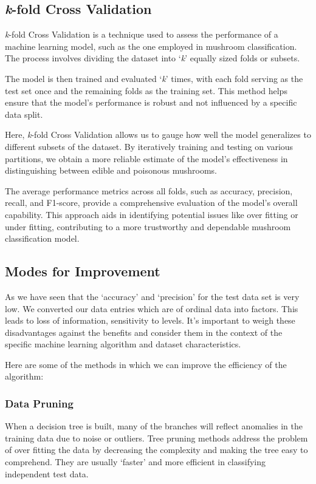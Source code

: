 \documentclass{article}
\begin{document}
\begin{justify}
\subsection{\textit{k}-fold Cross Validation}
\textit{k}-fold Cross Validation is a technique used to assess the performance of a machine learning model, such as the one employed in mushroom classification. The process involves dividing the dataset into `\textit{k}' equally sized folds or subsets. 

The model is then trained and evaluated `\textit{k}' times, with each fold serving as the test set once and the remaining folds as the training set. This method helps ensure that the model's performance is robust and not influenced by a specific data split. 

Here, \textit{k}-fold Cross Validation allows us to gauge how well the model generalizes to different subsets of the dataset. By iteratively training and testing on various partitions, we obtain a more reliable estimate of the model's effectiveness in distinguishing between edible and poisonous mushrooms. 

The average performance metrics across all folds, such as accuracy, precision, recall, and F1-score, provide a comprehensive evaluation of the model's overall capability. This approach aids in identifying potential issues like over fitting or under fitting, contributing to a more trustworthy and dependable mushroom classification model.


\subsection{Modes for Improvement}
As we have seen that the `accuracy' and `precision' for the test data set is very low. We converted our data entries which are of ordinal data into factors. This leads to loss of information, sensitivity to levels. It's important to weigh these disadvantages against the benefits and consider them in the context of the specific machine learning algorithm and dataset characteristics.

Here are some of the methods in which we can improve the efficiency of the algorithm:

\subsubsection{Data Pruning}
When a decision tree is built, many of the branches will reflect anomalies in the training data due to noise or outliers. Tree pruning methods address the problem of over fitting the data by decreasing the complexity and making the tree easy to comprehend. They are usually `faster' and more efficient in classifying independent test data.


\end{justify}
\end{document}
